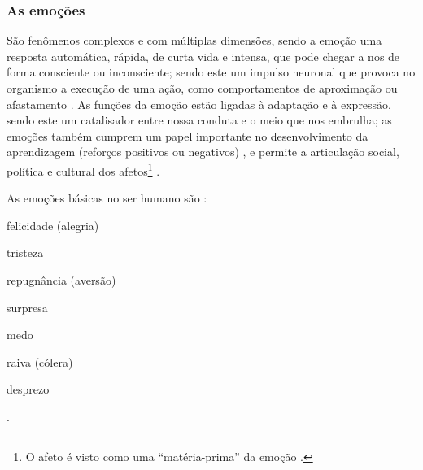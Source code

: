 \subsubsection{As emoções} 
São fenômenos complexos e com múltiplas dimensões,
sendo a emoção uma resposta automática, rápida, de curta vida e intensa, 
que pode chegar a nos de forma consciente ou inconsciente;
sendo este um impulso neuronal que provoca no organismo a execução de uma ação,
como comportamentos de aproximação ou afastamento
\cite[pp. 288]{zanelli2014psicologia}  \cite{freitas2015codigo}.
As funções da emoção estão ligadas à adaptação e à expressão, 
sendo este um catalisador entre nossa conduta e o meio que nos embrulha;
as emoções também cumprem um papel importante no desenvolvimento da aprendizagem 
(reforços positivos ou negativos)
  \cite{freitas2015codigo},
e permite a articulação social, política e cultural dos afetos\footnote{O 
afeto é visto como uma ``matéria-prima'' da emoção \cite[pp. 43]{hofman2015affective}.} 
\cite[pp. 43]{hofman2015affective}.

As emoções básicas no ser humano são \cite{freitas2015codigo} \cite[pp. 291]{zanelli2014psicologia}:
\begin{inparaitem}
\item felicidade (alegria)  %
\item tristeza              %
\item repugnância (aversão) %
\item surpresa              %
\item medo                  %
\item raiva (cólera)        %
\item desprezo              %
\end{inparaitem}.

